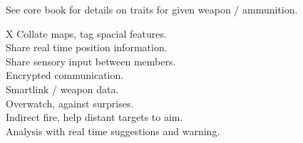 See core book for details on traits for given weapon / ammunition.

\bigskip

\begin{eptable}{ X }
   Collate maps, tag spacial features.\\
   Share real time position information.\\
   Share sensory input between members.\\
   Encrypted communication.\\
   Smartlink / weapon data.\\
   Overwatch,  against surprises.\\
   Indirect fire, help distant targets to aim.\\
   Analysis with real time suggestions and warning.\\
\end{eptable}
